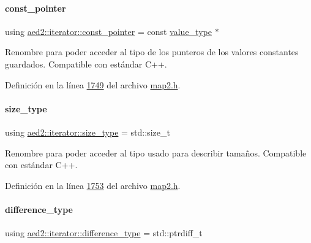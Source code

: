 \paragraph{\texorpdfstring{const\+\_\+pointer}{const\_pointer}}
{\footnotesize\ttfamily using \hyperlink{classaed2_1_1iterator_afa70c9577ce04d4d7b84741fababc5ac_afa70c9577ce04d4d7b84741fababc5ac}{aed2\+::iterator\+::const\+\_\+pointer} =  const \hyperlink{classaed2_1_1iterator_a6411a2c08b2b7c52f063bef1a168acb6_a6411a2c08b2b7c52f063bef1a168acb6}{value\+\_\+type} $\ast$}



Renombre para poder acceder al tipo de los punteros de los valores constantes guardados. Compatible con estándar C++. 



Definición en la línea \hyperlink{map2_8h_source_l01749}{1749} del archivo \hyperlink{map2_8h_source}{map2.\+h}.

\mbox{\label{classaed2_1_1iterator_a0d460d3f76439cea3436e1113990be47_a0d460d3f76439cea3436e1113990be47}} 
\paragraph{\texorpdfstring{size\+\_\+type}{size\_type}}
{\footnotesize\ttfamily using \hyperlink{classaed2_1_1iterator_a0d460d3f76439cea3436e1113990be47_a0d460d3f76439cea3436e1113990be47}{aed2\+::iterator\+::size\+\_\+type} =  std\+::size\+\_\+t}



Renombre para poder acceder al tipo usado para describir tamaños. Compatible con estándar C++. 



Definición en la línea \hyperlink{map2_8h_source_l01753}{1753} del archivo \hyperlink{map2_8h_source}{map2.\+h}.

\mbox{\label{classaed2_1_1iterator_a552af1cab9391f5af6bb86d457031329_a552af1cab9391f5af6bb86d457031329}} 
\paragraph{\texorpdfstring{difference\+\_\+type}{difference\_type}}
{\footnotesize\ttfamily using \hyperlink{classaed2_1_1iterator_a552af1cab9391f5af6bb86d457031329_a552af1cab9391f5af6bb86d457031329}{aed2\+::iterator\+::difference\+\_\+type} =  std\+::ptrdiff\+\_\+t}



